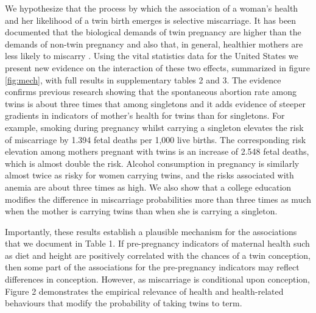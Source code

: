 \documentclass{nature}
\begin{document}
\begin{linenumbers}
We hypothesize that the process by which the association of a woman's health and her likelihood of a twin birth emerges is selective miscarriage. It has been documented that the biological demands of twin pregnancy are higher than the demands of non-twin pregnancy\cite{Shinagawaetal2005,Kahnetal2003} and also that, in general, healthier mothers are less likely to miscarry \cite{Frettsetal1995,Garciaetal2002}. Using the vital statistics data for the United States we present new evidence on the interaction of these two effects, summarized in figure \ref{fig:mech}, with full results in supplementary tables 2 and 3. The evidence confirms previous research showing that the spontaneous abortion rate among twins is about three times that among singletons\cite{Boklage1990} and it adds evidence of steeper gradients in indicators of mother's health for twins than for singletons. For example, smoking during pregnancy whilst carrying a singleton elevates the risk of miscarriage by 1.394 fetal deaths per  1,000 live births. The corresponding risk elevation among mothers pregnant with twins is an increase of 2.548 fetal deaths, which is almost double the risk. Alcohol consumption in pregnancy is similarly almost twice as risky for women carrying twins, and the risks associated with anemia are about three times as high. We also show that a college education modifies the difference in miscarriage probabilities more than three times as much when the mother is carrying twins than when she is carrying a singleton. 

Importantly, these results establish a plausible mechanism for the associations that we document in Table 1. If pre-pregnancy indicators of maternal health such as diet and height are positively correlated with the chances of a twin conception, then some part of the associations for the pre-pregnancy indicators may reflect differences in conception. However, as miscarriage is conditional upon conception, Figure 2 demonstrates the empirical relevance of health and health-related behaviours that modify the probability of taking twins to term. %



\end{linenumbers}
\end{document}
